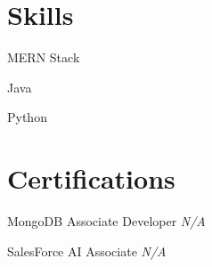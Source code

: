 \documentclass[a4paper,10pt]{article}
\begin{document}

\section*{Skills}
\noindent
\begin{compactitem}
    
        \item MERN Stack 
    
        \item Java 
    
        \item Python
    
\end{compactitem}



\section*{Certifications}
\noindent
\begin{compactitem}
    
        \item MongoDB Associate Developer \hfill \textit{ N/A }
    
        \item SalesForce AI Associate \hfill \textit{ N/A }
    
\end{compactitem}
\end{document}
